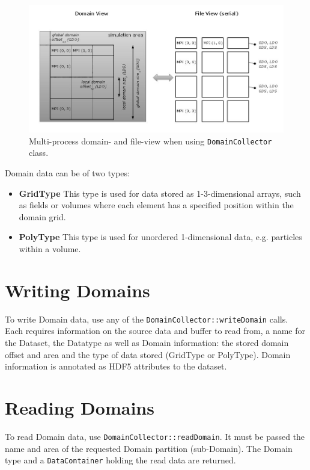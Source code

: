 \documentclass[a4paper,10pt,BCOR12mm]{report}
\newcommand{\code}[1]{\small \texttt{#1}}
\begin{document}
\begin{figure}[hb]
 \includegraphics[width=\linewidth]{../img/domains_serial.jpg}
 \caption{Multi-process domain- and file-view when using \code{DomainCollector} class.}
\end{figure}

Domain data can be of two types:
\begin{itemize}
	\item \textbf{GridType}
	This type is used for data stored as 1-3-dimensional arrays, such as fields or volumes
	where each element has a specified position within the domain grid.

	\item \textbf{PolyType}
	This type is used for unordered 1-dimensional data, e.g. particles within a volume.
\end{itemize}

\section{Writing Domains}

To write Domain data, use any of the \code{DomainCollector::writeDomain} calls.
Each requires information on the source data and buffer to read from, a name for the Dataset, the Datatype as well as
Domain information: the stored domain offset and area and the type of data stored (GridType or PolyType).
Domain information is annotated as HDF5 attributes to the dataset.

\section{Reading Domains}

To read Domain data, use \code{DomainCollector::readDomain}.
It must be passed the name and area of the requested Domain partition (sub-Domain).
The Domain type and a \code{DataContainer} holding the read data are returned.
\end{document}
